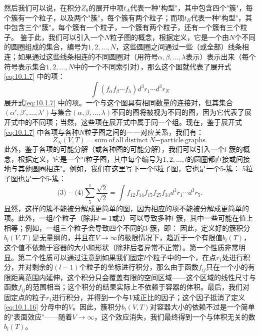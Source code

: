 然后我们可以说，在积分\(Z_{8}\)的展开中项\(t_{A}\)代表一种"构型"，其中包含四个"簇"，每个簇有一个粒子，以及两个"簇"，每个簇有两个粒子；而项\(t_{B}\)代表一种"构型"，其中包含三个"簇"，每个簇有一个粒子，一个簇有两个粒子，还有一个簇有三个粒子。
鉴于此，我们可以引入一个\(N\)粒子图的概念，根据定义，它是一个由\(N\)个不同的圆圈组成的集合，编号为\(1,2,\ldots,N\)，这些圆圈之间通过一些（或全部）线条相连；如果通过这些线条相连的不同圆圈对（用符号\(\alpha,\beta,\ldots,\lambda\)表示）表示出来（每个符号表示集合\(1,2,\ldots,N\)中的一个不同索引对），那么这个图就代表了展开式\autoref{eq:10.1.7} 中的项：
\begin{equation}\tag{10.1.11}\label{eq:10.1.11}
\int ( f _ { \alpha } f _ { \beta } \cdots f _ { \lambda } ) d ^{3} r _ { 1 } \cdots d ^{3} r _ { N }
\end{equation}
展开式\autoref{eq:10.1.7} 中的项。一个与这个图具有相同数量的连接对，但其集合\((\alpha',\beta',\ldots,\lambda')\)与集合\((\alpha,\beta,\ldots,\lambda)\)不同的图将被视为不同的图，因为它代表了展开式中的不同项；当然，这些项在展开式中属于同一个组。现在，鉴于展开式\autoref{eq:10.1.7} 中各项与各种\(N\)粒子图之间的一一对应关系，我们有：
\begin{equation}\tag{10.1.12}\label{eq:10.1.12}
Z _ { N } ( V , T ) = \mathrm { s u m ~ o f ~ a l l ~ d i s t i n c t ~ } N \mathrm { - p a r t i c l e ~ g r a p h s } .
\end{equation}
此外，鉴于各项的可能分解（或各种图的可能分解），我们可以引入一个\(l\)-簇的概念，根据定义，它是一个"\(l\)粒子图，其中每个编号为\(1,2,\ldots,l\)的圆圈都直接或间接地与其他圆圈相连"。例如，我们在这里写下一个5粒子图，它也是一个5-簇：
5粒子图也是一个5-簇：
\begin{equation}\tag{10.1.13}\label{eq:10.1.13}
\text{(3)}-\text{(4)}\sum_{5}^{1}\frac{\sqrt{2}}{\sqrt{2}}=\int f_{12}f_{14}f_{15}f_{25}f_{34}d^3r_1\cdots d^3r_5.
\end{equation}
显然，这样的簇不能被分解成更简单的图，因为相应的项不能被分解成更简单的项。此外，一组\(l\)个粒子（除非\(l=1\)或\(2\)）可以导致多种\(l\)-簇，其中一些可能在值上相等；例如，一组三个粒子会导致四个不同的3-簇，即：
因此，定义好的簇积分\(b_{l}(V,T)\)是无量纲的，并且在\(V\to\infty\)的极限情况下，趋近于一个有限值\(b_{l}(T)\)，这个值不依赖于容器的大小和形状（除非后者异常不正常）。第一个性质非常明显。第二个性质可以通过注意到如果我们固定\(l\)个粒子中的一个，在点\(r_{1}\)处进行积分，并对剩余的\((l-1)\)个粒子的坐标进行积分，那么由于函数\(f_{ij}\)只在一个小的有限距离范围内延伸，这个积分只会覆盖有限的空间区域——这个区域的线性尺寸与函数\(f_{ij}\)的范围相当；这个积分的结果实际上不依赖于容器的体积。最后，我们对固定点的粒子\(r_{1}\)进行积分，并得到一个与\(V\)成正比的因子；这个因子抵消了定义\autoref{eq:10.1.16} 分母中的\(V\)。因此，簇积分\(b_{l}(V,T)\)对容器大小的依赖不过是一个简单的"表面效应"——随着\(V\to\infty\)，这个效应消失，我们最终得到一个与体积无关的数\(b_{l}(T)\)。
